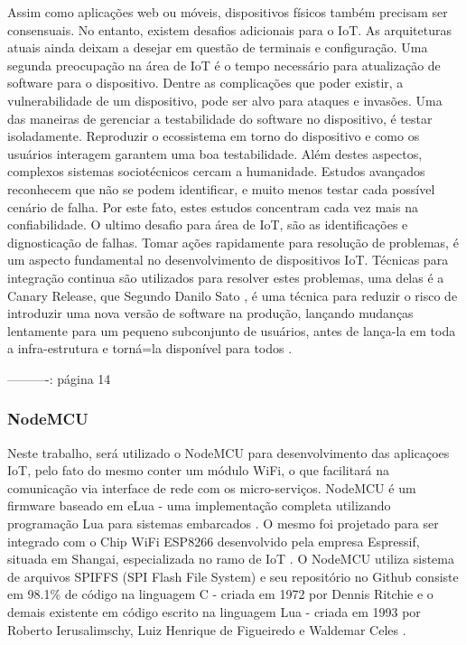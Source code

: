\documentclass[journal]{IEEEtran}
\begin{document}
Assim como aplicações web ou móveis, dispositivos físicos também precisam ser consensuais. No entanto, existem desafios adicionais para o IoT. As arquiteturas atuais ainda deixam a desejar em questão de terminais e configuração. Uma segunda preocupação na área de IoT é o tempo necessário para atualização de software para o dispositivo. Dentre as  complicações que poder existir, a vulnerabilidade de um dispositivo, pode ser alvo para ataques e invasões. Uma das maneiras de gerenciar a testabilidade do software no dispositivo, é testar isoladamente. Reproduzir o ecossistema em torno do dispositivo e como os usuários interagem garantem uma boa testabilidade. Além destes aspectos, complexos sistemas sociotécnicos cercam a humanidade. Estudos avançados reconhecem que não se podem identificar, e muito menos testar cada possível cenário de falha. Por este fato, estes estudos concentram cada vez mais na confiabilidade. O ultimo desafio para área de IoT, são as identificações e dignosticação de falhas. Tomar ações rapidamente para resolução de problemas, é um aspecto fundamental no desenvolvimento de dispositivos IoT. Técnicas para integração continua são utilizados para resolver estes problemas, uma delas é a Canary Release, que Segundo Danilo Sato \cite{danilosato2017}, é uma técnica para reduzir o risco de introduzir uma nova versão de software na produção, lançando mudanças lentamente para um pequeno subconjunto de usuários, antes de lança-la em toda a infra-estrutura e torná=la disponível para todos \cite[p.~9]{dzoneiotvolume4}.



----------: página 14


\subsubsection{NodeMCU}

Neste trabalho, será utilizado o NodeMCU para desenvolvimento das aplicaçoes IoT, pelo fato do mesmo conter um módulo WiFi, o que facilitará na comunicação via interface de rede com os micro-serviços. NodeMCU é um firmware baseado em eLua - uma implementação completa utilizando programação Lua para sistemas embarcados \cite{elua2017}. O mesmo foi projetado para ser integrado com o Chip WiFi ESP8266 desenvolvido pela empresa Espressif, situada em Shangai, especializada no ramo de IoT \cite{systems}. O NodeMCU utiliza sistema de arquivos SPIFFS (SPI Flash File System) e seu repositório no Github consiste
 em 98.1\% de código na linguagem C - criada em 1972 por Dennis Ritchie \cite{williamstewart2017} e o demais existente em código escrito na linguagem Lua  - criada em 1993 por Roberto Ierusalimschy, Luiz Henrique de Figueiredo e Waldemar Celes \cite{lua2017Authors}.
\end{document}
